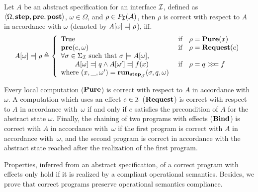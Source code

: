 \begin{definition} \label{def:freespec:correctness}
  Let $A$ be an abstract specification for an interface $\mathcal{I}$, defined as
  $\langle \Omega, \mathbf{\mathbf{step}}, \mathbf{\mathbf{pre}}, \mathbf{\mathbf{post}} \rangle$, $\omega \in
  \Omega$, and $\rho \in P_{\mathcal{I}}(\mathcal{A})$, then $\rho$ is correct
  with respect to $A$ in accordance with $\omega$ (denoted by $A[\omega]
  \modelssym \rho$), iff.
  \[
    A[\omega] \mathrel{\reflectbox{$\models$}} \rho \triangleq \left\{
      \begin{array}{lcl}
        \text{True} & \text{ if} & \rho = \func{Pure}(x) \\
        \func{pre}(e, \omega) & \text{ if} & \rho = \func{Request}(e) \\
        \forall \sigma \in \Sigma_{\I} \text{ such that } \sigma \models
        A[\omega], & & \\
        \qquad A[\omega] \modelssym q \wedge A[\omega'] \modelssym f(x) & \text{
                                                                          if} & \rho = q \bind f \\
        \text{where }(x, \_, \omega') =
        \func{run}_{\func{step}_{\J}}(\sigma, q, \omega) & \\
      \end{array}
    \right.
  \]
\end{definition}

Every local computation ($\mathbf{\mathbf{Pure}}$) is correct with respect to
$A$ in accordance with~$\omega$.
%
A computation which uses an effect $e \in \mathcal{I}$ ($\mathbf{\mathbf{Request}}$) is
correct with respect to $A$ in accordance with~$\omega$ if and
only if $e$ satisfies the precondition of $A$ for the abstract
state $\omega$.
%
Finally, the chaining of two programs with effects ($\mathbf{\mathbf{Bind}}$) is correct
with $A$ in accordance with~$\omega$ if the first program is
correct with $A$ in accordance with~$\omega$, and the second
program is correct in accordance with the abstract state reached after the
realization of the first program.

Properties, inferred from an abstract specification, of a correct program with
effects only hold if it is realized by a compliant operational semantics.
%
Besides, we prove that correct programs preserve operational semantics
compliance.

